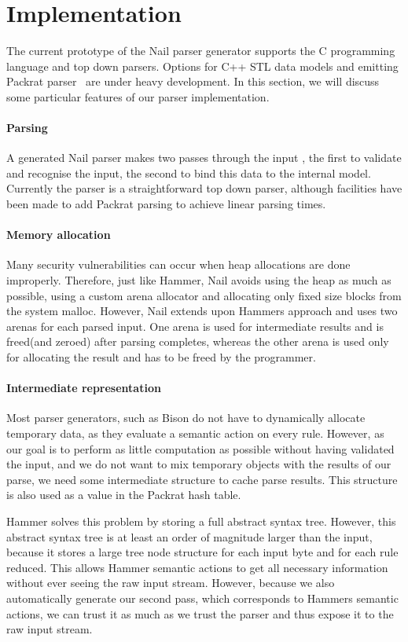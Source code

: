 \section{Implementation}
\label{s:impl}

The current prototype of the Nail parser generator supports the C programming language and top down parsers. Options for C++ STL data models and emitting Packrat parser~\cite{packrat-parsing:icfp02} are under heavy development. In this section, we will discuss some particular
features of our parser implementation.

\paragraph{Parsing}
A generated Nail parser makes two passes through the input , the first to validate and recognise the
input, the second to bind this data to the internal model. Currently the parser is a straightforward
top down parser, although facilities have been made to add Packrat parsing to achieve linear parsing times.
\paragraph{Memory allocation} 
Many security vulnerabilities can occur when heap allocations are done improperly. Therefore, just
like Hammer, Nail avoids using the heap as much as possible, using a custom arena allocator and
allocating only fixed size blocks from the system malloc. However, Nail extends upon Hammers
approach and uses two arenas for each parsed input. One arena is used for intermediate results and is
freed(and zeroed) after parsing completes, whereas the other arena is used only for allocating the
result and has to be freed by the programmer. 

\paragraph{Intermediate representation}
Most parser generators, such as Bison do not have to dynamically allocate temporary
data, as they evaluate a semantic action on every rule. However, as our goal is to perform as little
computation as possible without having validated the input, and we do not want to mix temporary
objects with the results of our parse, we need some intermediate structure to cache parse results.
This structure is also used as a value in the Packrat hash table. 

Hammer solves this problem by storing a full abstract syntax tree. However, this abstract syntax
tree is at least an order of magnitude larger than the input, because it stores a large tree node
structure for each input byte and for each rule reduced. This allows Hammer semantic actions to get
all necessary information without ever seeing the raw input stream. However, because we also
automatically generate our second pass, which corresponds to Hammers semantic actions, we can trust
it as much as we trust the parser and thus expose it to the raw input stream. 

